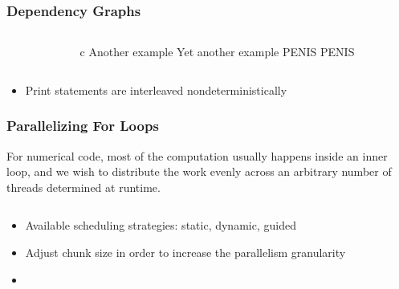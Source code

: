 \documentclass[handout]{beamer}
\begin{document}
\begin{frame}[fragile]
  \frametitle{Dependency Graphs}
  \begin{columns}[t]%
    \begin{column}{0.65\textwidth}
    \end{column}
    \pause
    \begin{column}{0.4\textwidth}
      \begin{ccode}[]
        {c}
        Another example
        Yet another example
        PENIS
        PENIS
      \end{ccode}
    \end{column}
  \end{columns}
  \pause
  \begin{itemize}
  \item Print statements are interleaved nondeterministically
  \end{itemize}
\end{frame}



\begin{frame}[fragile]
  \frametitle{Parallelizing For Loops}
  For numerical code, most of the computation usually happens inside an inner loop, and we wish to distribute the work evenly across an arbitrary number of threads determined at runtime.
  \begin{columns}[t]%
    \begin{column}{0.65\textwidth}
    \end{column}
    \pause
    \begin{column}{0.4\textwidth}
    \end{column}
  \end{columns}
  \pause
  \begin{itemize}
  \item Available scheduling strategies: static, dynamic, guided
  \item Adjust chunk size in order to increase the parallelism granularity
  \item  
  \end{itemize}
\end{frame}
\end{document}
